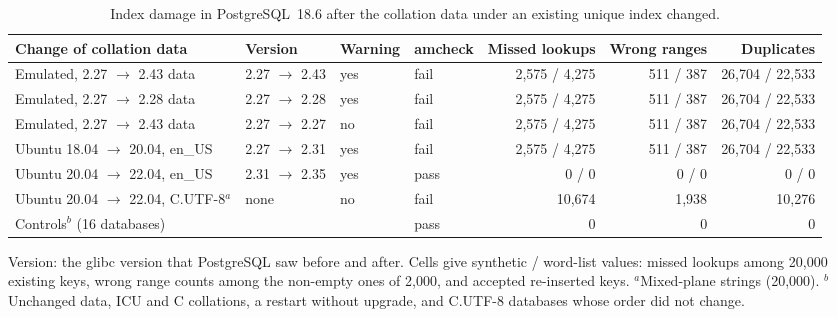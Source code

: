 \begin{table}[t]
\centering\footnotesize
\setlength{\tabcolsep}{4pt}
\caption{Index damage in PostgreSQL~18.6 after the collation data under an existing unique index changed.}
\label{tab:drift}
\begin{tabular}{@{}llllrrr@{}}
\toprule
Change of collation data & Version & Warning & amcheck & Missed lookups & Wrong ranges & Duplicates \\
\midrule
Emulated, 2.27 $\to$ 2.43 data & 2.27 $\to$ 2.43 & yes & fail & 2,575 / 4,275 & 511 / 387 & 26,704 / 22,533 \\
Emulated, 2.27 $\to$ 2.28 data & 2.27 $\to$ 2.28 & yes & fail & 2,575 / 4,275 & 511 / 387 & 26,704 / 22,533 \\
Emulated, 2.27 $\to$ 2.43 data & 2.27 $\to$ 2.27 & no & fail & 2,575 / 4,275 & 511 / 387 & 26,704 / 22,533 \\
Ubuntu 18.04 $\to$ 20.04, en\_US & 2.27 $\to$ 2.31 & yes & fail & 2,575 / 4,275 & 511 / 387 & 26,704 / 22,533 \\
Ubuntu 20.04 $\to$ 22.04, en\_US & 2.31 $\to$ 2.35 & yes & pass & 0 / 0 & 0 / 0 & 0 / 0 \\
Ubuntu 20.04 $\to$ 22.04, C.UTF-8$^{a}$ & none & no & fail & 10,674 & 1,938 & 10,276 \\
Controls$^{b}$ (16 databases) & & & pass & 0 & 0 & 0 \\
\bottomrule
\end{tabular}

\smallskip\footnotesize
Version: the glibc version that PostgreSQL saw before and after. Cells give synthetic / word-list values: missed lookups among 20,000 existing keys, wrong range counts among the non-empty ones of 2,000, and accepted re-inserted keys. $^{a}$Mixed-plane strings (20,000). $^{b}$Unchanged data, ICU and C collations, a restart without upgrade, and C.UTF-8 databases whose order did not change.
\end{table}
